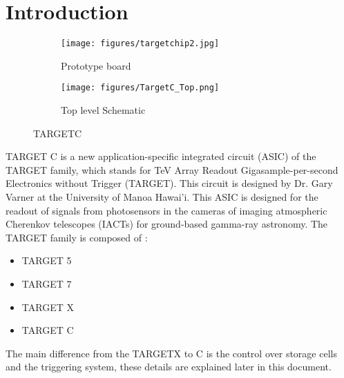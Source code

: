 \section{Introduction}

\begin{figure}[H]
    \centering
    \begin{subfigure}[b]{0.35\textwidth}
			\texttt{[image: figures/targetchip2.jpg]}\\
			\caption{\label{fig:TC_chip} Prototype board}
    \end{subfigure}\hfill
    \begin{subfigure}[b]{0.55\textwidth}
			\texttt{[image: figures/TargetC\_Top.png]}\\
			\caption{\label{fig:TC_top} Top level Schematic}
    \end{subfigure}
    \caption{TARGETC}\label{fig:tctopchip}
\end{figure}

\noindent
TARGET C is a new application-specific integrated circuit (ASIC) of the TARGET family, which stands for TeV Array Readout Gigasample-per-second Electronics without Trigger (TARGET). This circuit is designed by Dr. Gary Varner at the University of Manoa Hawai'i. This ASIC is designed for the readout of signals from photosensors in the cameras of imaging atmospheric Cherenkov telescopes (IACTs) for ground-based gamma-ray astronomy. The TARGET family is composed of :
\begin{itemize}
  \item TARGET 5
  \item TARGET 7
  \item TARGET X
  \item TARGET C
\end{itemize}

\noindent
The main difference from the TARGETX to C is the control over storage cells and the triggering system, these details are explained later in this document.

\newpage
